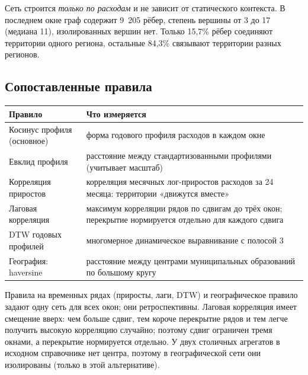 \documentclass[11pt,a4paper]{article}
\newcounter{none}\def\LTcaptype{none}
\begin{document}
Сеть строится \emph{только по расходам} и не зависит от статического контекста. В последнем окне граф содержит 9~205 рёбер, степень вершины от 3 до 17 (медиана 11), изолированных вершин нет. Только 15,7\% рёбер соединяют территории одного региона, остальные 84,3\% связывают территории разных регионов.

\subsection{Сопоставленные правила}\label{ux441ux43eux43fux43eux441ux442ux430ux432ux43bux435ux43dux43dux44bux435-ux43fux440ux430ux432ux438ux43bux430}

\begingroup\small\setlength{\tabcolsep}{4pt}

{\def\LTcaptype{none} %
\begin{longtable}[]{@{}
  >{\raggedright\arraybackslash}p{}
  >{\raggedright\arraybackslash}p{}@{}}
\toprule\noalign{}
\begin{minipage}[b]{\linewidth}\raggedright
Правило
\end{minipage} & \begin{minipage}[b]{\linewidth}\raggedright
Что измеряется
\end{minipage} \\
\midrule\noalign{}
\endhead
\bottomrule\noalign{}
\endlastfoot
Косинус профиля (основное) & форма годового профиля расходов в каждом окне \\
Евклид профиля & расстояние между стандартизованными профилями (учитывает масштаб) \\
Корреляция приростов & корреляция месячных лог-приростов расходов за 24 месяца: территории «движутся вместе» \\
Лаговая корреляция & максимум корреляции рядов по сдвигам до трёх окон; перекрытие нормируется отдельно для каждого сдвига \\
DTW годовых профилей & многомерное динамическое выравнивание с полосой 3 \\
География: haversine & расстояние между центрами муниципальных образований по большому кругу \\
\end{longtable}
}

\endgroup

Правила на временных рядах (приросты, лаги, DTW) и географическое правило задают одну сеть для всех окон; они ретроспективны. Лаговая корреляция имеет смещение вверх: чем больше сдвиг, тем короче перекрытие рядов и тем легче получить высокую корреляцию случайно; поэтому сдвиг ограничен тремя окнами, а перекрытие нормируется отдельно. У двух столичных агрегатов в исходном справочнике нет центра, поэтому в географической сети они изолированы (только в этой альтернативе).
\end{document}
